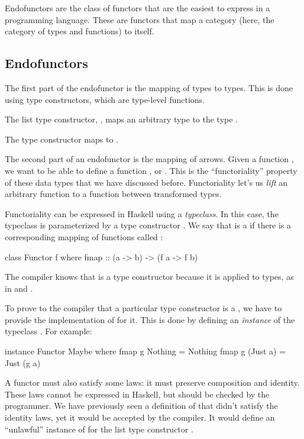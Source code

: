 \documentclass[DaoFP]{subfiles}
\begin{document}
Endofunctors are the class of functors that are the easiest to express in a programming language. These are functors that map a category (here, the category of types and functions) to itself. 

\subsection{Endofunctors}
The first part of the endofunctor is the mapping of types to types. This is done using type constructors, which are type-level functions. 

The list type constructor, , maps an arbitrary type  to the type .

The  type constructor maps  to .

The second part of an endofunctor is the mapping of arrows. Given a function , we want to be able to define a function , or . This is the ``functoriality'' property of these data types that we have discussed before. Functoriality let's us \emph{lift} an arbitrary function to a function between transformed types.

Functoriality can be expressed in Haskell using a \emph{typeclass}. In this case, the typeclass is parameterized by a type constructor . We say that  is a  if there is a corresponding mapping of functions called :
\begin{haskell}
class Functor f where
  fmap :: (a -> b) -> (f a -> f b)
\end{haskell}
The compiler knows that  is a type constructor because it is applied to types, as in  and .

To prove to the compiler that a particular type constructor is a , we have to provide the implementation of  for it. This is done by defining an \emph{instance} of the typeclass . For example:
\begin{haskell}
instance Functor Maybe where
  fmap g Nothing  = Nothing
  fmap g (Just a) = Just (g a)
\end{haskell}

A functor must also satisfy some laws: it must preserve composition and identity. These laws cannot be expressed in Haskell, but should be checked by the programmer. We have previously seen a definition of  that didn't satisfy the identity laws, yet it would be accepted by the compiler. It would define an ``unlawful'' instance of  for the list type constructor \hask{[]}.
\end{document}
